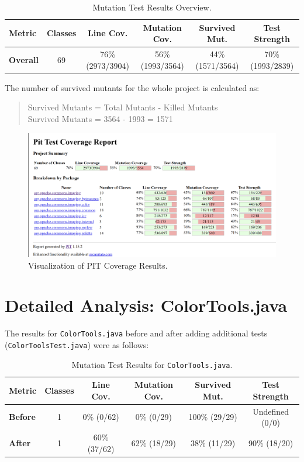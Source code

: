 \documentclass[a4paper,12pt]{report}
\begin{document}
\begin{table}[H]
    \centering
    \begin{tabular}{|l|c|c|c|c|c|}
        \hline
        \textbf{Metric} & \textbf{Classes} & \textbf{Line Cov.} & \textbf{Mutation Cov.}& \textbf{Survived Mut.} & \textbf{Test Strength} \\ \hline
        \textbf{Overall} & 69 & 76\% (2973/3904) & 56\% (1993/3564) & 44\% (1571/3564) & 70\% (1993/2839) \\ \hline
    \end{tabular}
    \caption{Mutation Test Results Overview.}
    \label{tab:mutation_results}
\end{table}

The number of survived mutants for the whole project is calculated as:

\begin{quote}
    Survived Mutants = Total Mutants - Killed Mutants \\
    Survived Mutants = 3564 - 1993 = 1571
\end{quote}

\begin{figure}[H]
    \centering
    \includegraphics[width=1\textwidth]{Report_Img/pit.png}
    \caption{Visualization of PIT Coverage Results.}
    \label{fig:mutation_coverage}
\end{figure}
\newpage
\section{Detailed Analysis: ColorTools.java}
The results for \texttt{ColorTools.java} before and after adding additional tests (\texttt{ColorToolsTest.java}) were as follows:

\begin{table}[H]
    \centering
    \begin{tabular}{|l|c|c|c|c|c|}
        \hline
        \textbf{Metric} & \textbf{Classes} & \textbf{Line Cov.} & \textbf{Mutation Cov.}& \textbf{Survived Mut.} & \textbf{Test Strength} \\ \hline
        \textbf{Before} & 1 & 0\% (0/62) & 0\% (0/29) & 100\% (29/29)  & Undefined (0/0) \\ \hline
        \textbf{After} & 1 & 60\% (37/62) & 62\% (18/29) & 38\% (11/29)  & 90\% (18/20) \\ \hline
    \end{tabular}
    \caption{Mutation Test Results for \texttt{ColorTools.java}.}
    \label{tab:mutation_results_color_tools}
\end{table}
\end{document}
